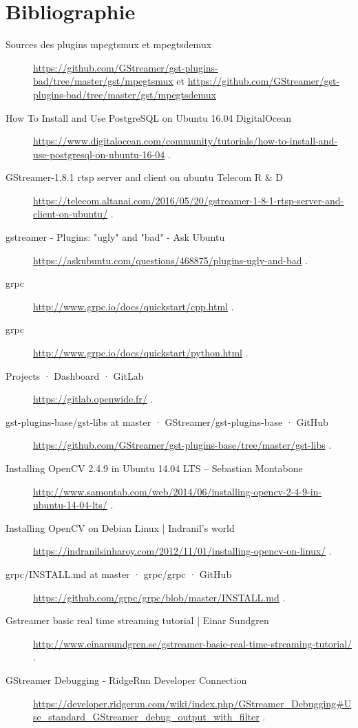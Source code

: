 \chapter{Bibliographie}

\begin{description} 

\item [Sources des plugins mpegtsmux et mpegtsdemux] \url{https://github.com/GStreamer/gst-plugins-bad/tree/master/gst/mpegtsmux} et \url{https://github.com/GStreamer/gst-plugins-bad/tree/master/gst/mpegtsdemux}

\item [How To Install and Use PostgreSQL on Ubuntu 16.04 DigitalOcean] \url{https://www.digitalocean.com/community/tutorials/how-to-install-and-use-postgresql-on-ubuntu-16-04} . 
\item [GStreamer-1.8.1 rtsp server and client on ubuntu Telecom R \& D] \url{https://telecom.altanai.com/2016/05/20/gstreamer-1-8-1-rtsp-server-and-client-on-ubuntu/} . 
\item [gstreamer - Plugins: "ugly" and "bad" - Ask Ubuntu] \url{https://askubuntu.com/questions/468875/plugins-ugly-and-bad} . 
\item [grpc] \url{http://www.grpc.io/docs/quickstart/cpp.html} . 
\item [grpc] \url{http://www.grpc.io/docs/quickstart/python.html} . 
\item [Projects · Dashboard · GitLab] \url{https://gitlab.openwide.fr/} . 
\item [gst-plugins-base/gst-libs at master · GStreamer/gst-plugins-base · GitHub] \url{https://github.com/GStreamer/gst-plugins-base/tree/master/gst-libs} . 
\item [Installing OpenCV 2.4.9 in Ubuntu 14.04 LTS – Sebastian Montabone] \url{http://www.samontab.com/web/2014/06/installing-opencv-2-4-9-in-ubuntu-14-04-lts/} . 
\item [Installing OpenCV on Debian Linux | Indranil's world] \url{https://indranilsinharoy.com/2012/11/01/installing-opencv-on-linux/} . 
\item [grpc/INSTALL.md at master · grpc/grpc · GitHub] \url{https://github.com/grpc/grpc/blob/master/INSTALL.md} . 
\item [Gstreamer basic real time streaming tutorial | Einar Sundgren] \url{http://www.einarsundgren.se/gstreamer-basic-real-time-streaming-tutorial/} . 
\item [GStreamer Debugging - RidgeRun Developer Connection] \url{https://developer.ridgerun.com/wiki/index.php/GStreamer_Debugging#Use_standard_GStreamer_debug_output_with_filter} . 

\end{description}
